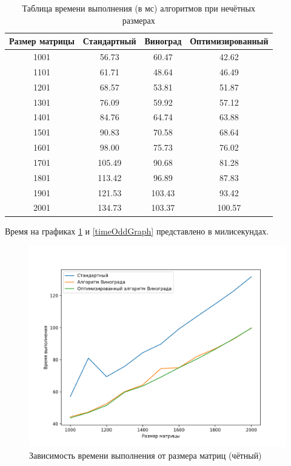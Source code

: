 \documentclass[12pt]{report}
\begin{document}
\begin{table} [h!]
    \label{timeOdd}
	\caption{Таблица времени выполнения (в мс) алгоритмов при нечётных размерах}
	\begin{center}
	\begin{tabular}{|c c c c|} 
		\hline
		Размер матрицы & Стандартный & Виноград & Оптимизированный \\  
		\hline
        1001 & 56.73 & 60.47 & 42.62  \\ 
        \hline
        1101 & 61.71 & 48.64 & 46.49  \\ 
        \hline
        1201 & 68.57 & 53.81 & 51.87  \\ 
        \hline
        1301 & 76.09 & 59.92 & 57.12  \\ 
        \hline
        1401 & 84.76 & 64.74 & 63.88  \\ 
        \hline
        1501 & 90.83 & 70.58 & 68.64  \\ 
        \hline
        1601 & 98.00 & 75.73 & 76.02  \\ 
        \hline
        1701 & 105.49 & 90.68 & 81.28  \\ 
        \hline
        1801 & 113.42 & 96.89 & 87.83  \\ 
        \hline
        1901 & 121.53 & 103.43 & 93.42  \\ 
        \hline
        2001 & 134.73 & 103.37 & 100.57  \\ 
        \hline
	\end{tabular}
\end{center}
\end{table}
\newpage
Время на графиках \ref{timeEvenGraph} и  \ref{timeOddGraph} представлено в милисекундах. 
\newpage
\begin{figure}[h!p]
	\centering
	\includegraphics[scale = 0.6]{even.png}
	\caption{Зависимость времени выполнения от размера матриц (чётный)}
	\label{timeEvenGraph}
\end{figure}
\end{document}
